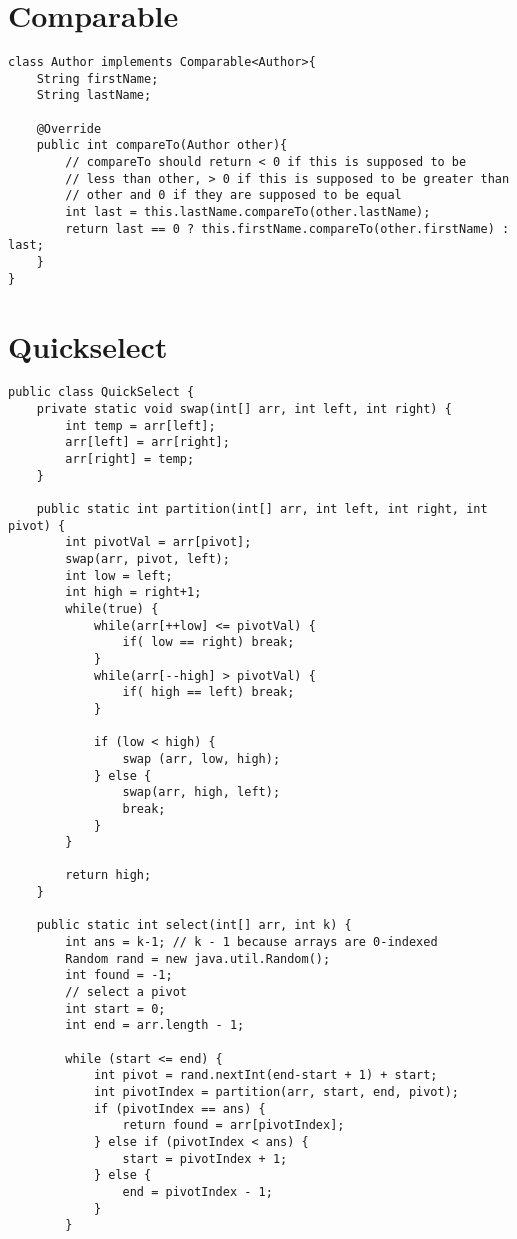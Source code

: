 \documentclass[11pt]{article}
\author{Jethro Kuan}
\date{\today}
\title{}
\begin{document}
\begin{multicols*}{2}
\section{Comparable}
\label{sec:org2fbee87}
\begin{verbatim}
class Author implements Comparable<Author>{
    String firstName;
    String lastName;

    @Override
    public int compareTo(Author other){
        // compareTo should return < 0 if this is supposed to be
        // less than other, > 0 if this is supposed to be greater than 
        // other and 0 if they are supposed to be equal
        int last = this.lastName.compareTo(other.lastName);
        return last == 0 ? this.firstName.compareTo(other.firstName) : last;
    }
}
\end{verbatim}
\section{Quickselect}
\label{sec:org0e6d79d}
\begin{verbatim}
public class QuickSelect {
    private static void swap(int[] arr, int left, int right) {
        int temp = arr[left];
        arr[left] = arr[right];
        arr[right] = temp;
    }

    public static int partition(int[] arr, int left, int right, int pivot) {
        int pivotVal = arr[pivot];
        swap(arr, pivot, left);
        int low = left;
        int high = right+1;
        while(true) {
            while(arr[++low] <= pivotVal) {
                if( low == right) break;
            }
            while(arr[--high] > pivotVal) {
                if( high == left) break;
            }

            if (low < high) {
                swap (arr, low, high);
            } else {
                swap(arr, high, left);
                break;
            }
        }

        return high;
    }

    public static int select(int[] arr, int k) {
        int ans = k-1; // k - 1 because arrays are 0-indexed
        Random rand = new java.util.Random();
        int found = -1;
        // select a pivot
        int start = 0;
        int end = arr.length - 1;

        while (start <= end) {
            int pivot = rand.nextInt(end-start + 1) + start;
            int pivotIndex = partition(arr, start, end, pivot);
            if (pivotIndex == ans) {
                return found = arr[pivotIndex];
            } else if (pivotIndex < ans) {
                start = pivotIndex + 1;
            } else {
                end = pivotIndex - 1;
            }
        }


\end{verbatim}
\end{multicols*}
\end{document}

